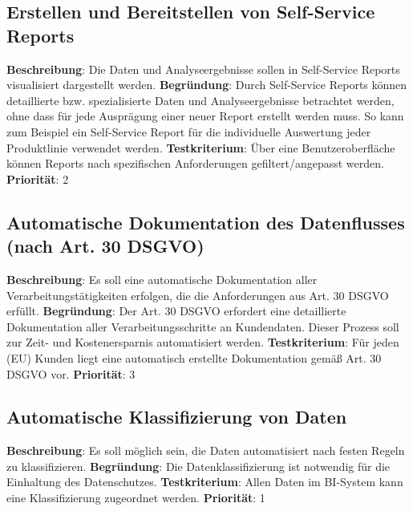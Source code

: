 \subsection{Erstellen und Bereitstellen von Self-Service Reports} \label{sec:anforderungsspezifikation:selfServiceReports}
\textbf{Beschreibung}: Die Daten und Analyseergebnisse sollen in Self-Service Reports visualisiert dargestellt werden.
\newline \textbf{Begründung}: Durch Self-Service Reports können detaillierte bzw. spezialisierte Daten und Analyseergebnisse betrachtet werden, ohne dass für jede Ausprägung einer neuer Report erstellt werden muss. So kann zum Beispiel ein Self-Service Report für die individuelle Auswertung jeder Produktlinie verwendet werden.
\newline \textbf{Testkriterium}: Über eine Benutzeroberfläche können Reports nach spezifischen Anforderungen gefiltert/angepasst werden.
\newline \textbf{Priorität}: 2

\subsection[Automatische Dokumentation des Datenflusses]{Automatische Dokumentation des Datenflusses (nach Art. 30 DSGVO)} \label{sec:anforderungsspezifikation:datenflussDokumentation}
\textbf{Beschreibung}: Es soll eine automatische Dokumentation aller Verarbeitungstätigkeiten erfolgen, die die Anforderungen aus Art. 30 DSGVO erfüllt.
\newline \textbf{Begründung}: Der Art. 30 DSGVO erfordert eine detaillierte Dokumentation aller Verarbeitungsschritte an Kundendaten. Dieser Prozess soll zur Zeit- und Kostenersparnis automatisiert werden.
\newline \textbf{Testkriterium}: Für jeden (EU) Kunden liegt eine automatisch erstellte Dokumentation gemäß Art. 30 DSGVO vor.
\newline \textbf{Priorität}: 3

\subsection{Automatische Klassifizierung von Daten} \label{sec:anforderungsspezifikation:DatenKlassifizierung}
\textbf{Beschreibung}: Es soll möglich sein, die Daten automatisiert nach festen Regeln zu klassifizieren. 
\newline \textbf{Begründung}: Die Datenklassifizierung ist notwendig für die Einhaltung des Datenschutzes.
\newline \textbf{Testkriterium}: Allen Daten im BI-System kann eine Klassifizierung zugeordnet werden.
\newline \textbf{Priorität}: 1
